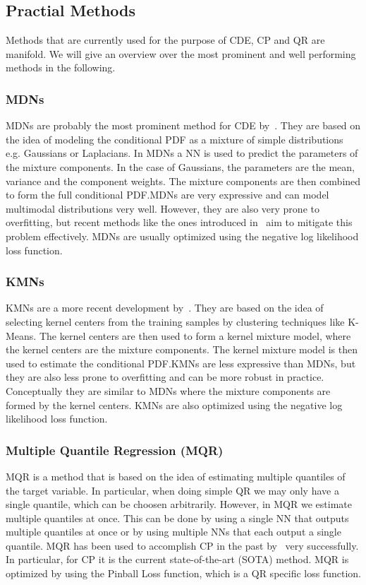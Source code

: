 \subsection{Practial Methods}
Methods that are currently used for the purpose of CDE, CP and QR are manifold. We will give an overview over the most prominent and well performing methods in the following.

\subsubsection{MDNs}
MDNs are probably the most prominent method for CDE by~\cite{bishop1994mixture}. They are based on the idea of modeling the conditional PDF as a mixture of simple distributions e.g. Gaussians or Laplacians. In MDNs a NN is used to predict the parameters of the mixture components. In the case of Gaussians, the parameters are the mean, variance and the component weights. The mixture components are then combined to form the full conditional PDF.\@ MDNs are very expressive and can model multimodal distributions very well. However, they are also very prone to overfitting, but recent methods like the ones introduced in~\cite{rothfuss2019noise} aim to mitigate this problem effectively. MDNs are usually optimized using the negative log likelihood loss function.

\subsubsection{KMNs}
KMNs are a more recent development by~\cite{ambrogioni2017kernel}. They are based on the idea of selecting kernel centers from the training samples by clustering techniques like K-Means. The kernel centers are then used to form a kernel mixture model, where the kernel centers are the mixture components. The kernel mixture model is then used to estimate the conditional PDF.\@ KMNs are less expressive than MDNs, but they are also less prone to overfitting and can be more robust in practice. Conceptually they are similar to MDNs where the mixture components are formed by the kernel centers. KMNs are also optimized using the negative log likelihood loss function.

\subsubsection{Multiple Quantile Regression (MQR)}
MQR is a method that is based on the idea of estimating multiple quantiles of the target variable. In particular, when doing simple QR we may only have a single quantile, which can be choosen arbitrarily. However, in MQR we estimate multiple quantiles at once. This can be done by using a single NN that outputs multiple quantiles at once or by using multiple NNs that each output a single quantile. MQR has been used to accomplish CP in the past by~\cite{sesia2021conformal} very successfully. In particular, for CP it is the current state-of-the-art (SOTA) method. MQR is optimized by using the Pinball Loss function, which is a QR specific loss function.

